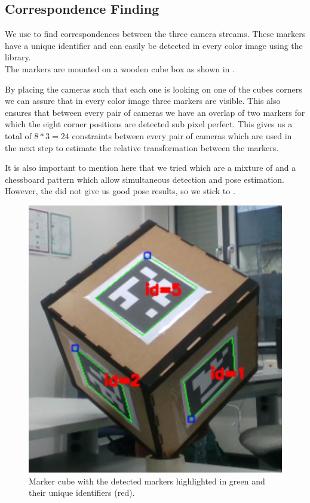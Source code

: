\documentclass[10pt,twocolumn,letterpaper]{article}
\begin{document}
%

\subsection{Correspondence Finding}
We use \aruco{} to find correspondences between the three camera streams. These markers have a unique identifier and can easily be detected in every color image using the \opencv{} library.\\
The markers are mounted on a wooden cube box as shown in .

By placing the cameras such that each one is looking on one of the cubes corners we can assure that in every color image three markers are visible. This also ensures that between every pair of cameras we have an overlap of two markers for which the eight corner positions are detected sub pixel perfect. This gives us a total of $8*3=24$ constraints between every pair of cameras which are used in the next step to estimate the relative transformation between the markers.

It is also important to mention here that we tried \charuco{} which are a mixture of \aruco{} and a chessboard pattern which allow simultaneous detection and pose estimation. However, the \charuco{} did not give us good pose results, so we stick to \aruco{}. 


\begin{figure}[t]
	\begin{center}
		\includegraphics[width=0.6\linewidth]{imgs/cube}
	\end{center}
	\caption{Marker cube with the detected markers highlighted in green and their unique identifiers (red).}
	\label{fig:cube}
\end{figure}
\end{document}
